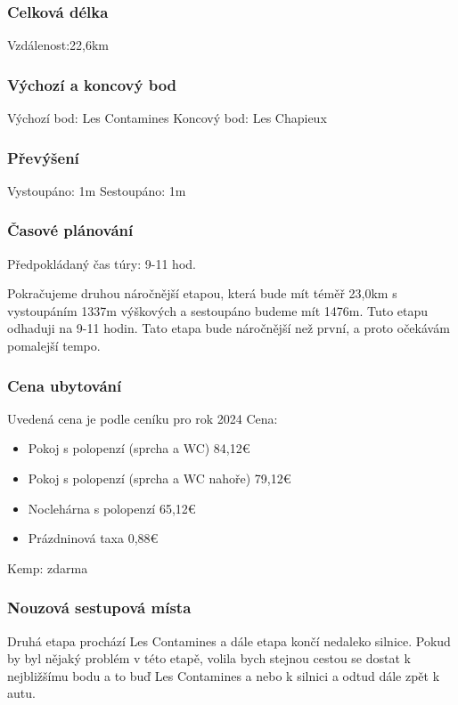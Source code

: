 \subsubsection*{Celková délka}
\noindent Vzdálenost:22,6\:km
\subsubsection*{Výchozí a koncový bod}
\noindent Výchozí bod: Les Contamines
\noindent Koncový bod: Les Chapieux
\subsubsection*{Převýšení}
\noindent Vystoupáno: 1\:m
\noindent Sestoupáno: 1\:m
\subsubsection*{Časové plánování}
\noindent Předpokládaný čas túry: 9-11 hod.

Pokračujeme druhou náročnější etapou, která bude mít téměř 23,0\:km s vystoupáním 1337\:m výškových a sestoupáno budeme mít 1476\:m. Tuto etapu odhaduji na 9-11 hodin. Tato etapa bude náročnější než první, a proto očekávám pomalejší tempo.
\subsubsection*{Cena ubytování}
\noindent Uvedená cena je podle ceníku pro rok 2024
\noindent Cena:
\begin{itemize}
	\item Pokoj s polopenzí (sprcha a WC) 84,12\:€
	\item Pokoj s polopenzí (sprcha a WC nahoře) 79,12\:€
	\item Noclehárna s polopenzí 65,12\:€
	\item Prázdninová taxa 0,88\:€
\end{itemize}

\noindent Kemp: zdarma

\subsubsection*{Nouzová sestupová místa}
Druhá etapa prochází Les Contamines a dále etapa končí nedaleko silnice. Pokud by byl nějaký problém v této etapě, volila bych stejnou cestou se dostat k nejbližšímu bodu a to buď Les Contamines a nebo k silnici a odtud dále zpět k autu.
